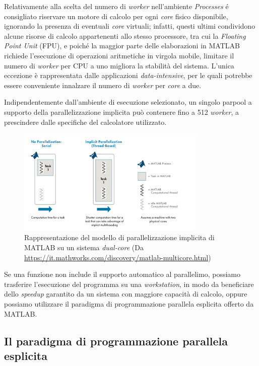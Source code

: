 Relativamente alla scelta del numero di \textit{worker} nell'ambiente \textit{Processes} \'e consigliato riservare un motore di calcolo per ogni \textit{core} 
fisico disponibile, ignorando la presenza di eventuali \textit{core} virtuali; infatti, questi ultimi condividono alcune risorse di calcolo appartenenti allo 
stesso processore, tra cui la \textit{Floating Point Unit} (FPU), e poich\'e la maggior parte delle elaborazioni in MATLAB richiede l'esecuzione di operazioni 
aritmetiche in virgola mobile, limitare il numero di \textit{worker} per CPU a uno migliora la stabilit\`a del sistema. \newline 
L'unica eccezione \`e rappresentata dalle applicazioni \textit{data-intensive}, per le quali potrebbe essere conveniente innalzare il numero di \textit{worker} per 
\textit{core} a due.

Indipendentemente dall'ambiente di esecuzione selezionato, un singolo parpool a supporto della parallelizzazione implicita pu\`o contenere fino a 512 \textit{worker}, a prescindere dalle specifiche 
del calcolatore utilizzato.
\begin{figure}[htbp]
    \centering
    \includegraphics[width=0.8\textwidth]{../Risorse/Capitolo 2/ImplicitParallelization.png}
    \caption{Rappresentazione del modello di parallelizzazione implicita di MATLAB su un sistema \textit{dual-core}
    \small{(Da \url{https://it.mathworks.com/discovery/matlab-multicore.html})}}
    \label{fig:ParallelismoImplicito}
\end{figure}\newline
Se una funzione non include il supporto automatico al parallelimo, possiamo trasferire l'esecuzione del programma su una \textit{workstation}, in modo da beneficiare 
dello \textit{speedup} garantito da un sistema con maggiore capacit\`a di calcolo, oppure possiamo utilizzare il paradigma di programmazione parallela esplicita offerto 
da MATLAB.

\subsection{Il paradigma di programmazione parallela esplicita}


